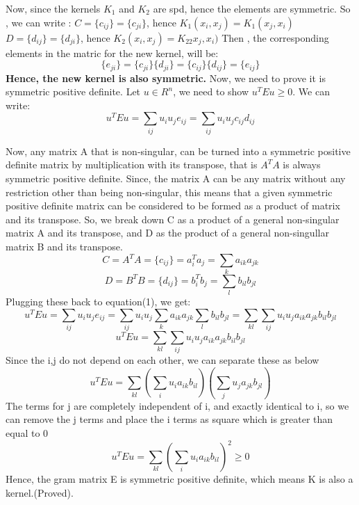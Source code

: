 \documentclass{article}
\begin{document}
    Now, since the kernels $K_1$ and $K_2$ are spd, hence the elements are symmetric. So , we can write : \newline
    $ C = \{c_{ij}\} = \{c_{ji}\}$, hence $ K_1(x_i, x_j) = K_1(x_j, x_i) $
    $ D = \{d_{ij}\} = \{d_{ji}\}$, hence $ K_2(x_i, x_j) = K_22x_j, x_i) $
    Then , the corresponding elements in the matric for the new kernel, will be:
    \[ \{e_{ji}\} = \{c_{ji}\}\{d_{ji}\} = \{c_{ij}\}\{d_{ij}\} = \{e_{ij}\}  \]
    \textbf {Hence, the new kernel is also symmetric. }
    Now, we need to prove it is symmetric positive definite. Let $u \in R^n$, we need to show $u^TEu \geq 0$. We can write:\newline
    \begin{equation}
    u^TEu = \sum_{ij} u_i u_j e_{ij} = \sum_{ij} u_i u_j c_{ij} d_{ij}
    \end{equation}

    Now, any matrix A that is non-singular, can be turned into a symmetric positive definite matrix by multiplication with its transpose, that is $A^TA$ is always symmetric positive definite. Since, the matrix A can be any matrix without any restriction other than being non-singular, this means that a given symmetric positive definite matrix can be considered to be formed as a product of  matrix and its transpose. So, we break down C as a product of a general non-singular matrix A and its transpose, and D as the product of a general non-singullar matrix B and its transpose. 
    \[C = A^TA = \{c_{ij}\} = a_{i}^Ta_j = \sum_{k} a_{ik}a_{jk} \]
    \[D = B^TB = \{d_{ij}\} = b_{i}^Tb_j = \sum_{l} b_{il}b_{jl} \]
   Plugging these back to equation(1), we get: 
    \[u^TEu = \sum_{ij} u_i u_j e_{ij} = \sum_{ij} u_i u_j \sum_{k} a_{ik}a_{jk} \sum_{l} b_{il}b_{jl} =\sum_{kl} \sum_{ij} u_i u_j a_{ik}a_{jk} b_{il}b_{jl}\] 
    \[u^TEu = \sum_{kl} \sum_{ij} u_i u_j a_{ik} a_{jk} b_{il} b_{jl}\]
    Since the i,j do not depend on each other, we can separate these as below
    \[u^TEu = \sum_{kl} ( \sum_{i} u_i a_{ik} b_{il}) (\sum_{j} u_j a_{jk} b_{jl})\]
    The terms for j are completely independent of i, and exactly identical to i, so we can remove the j terms and place the i terms as square which is greater than equal to 0
    \[u^TEu = \sum_{kl} ( \sum_{i} u_i a_{ik} b_{il})^2 \geq 0\]
    Hence, the gram matrix E is symmetric positive definite, which means K is also a kernel.(Proved). \newline
\end{document}

